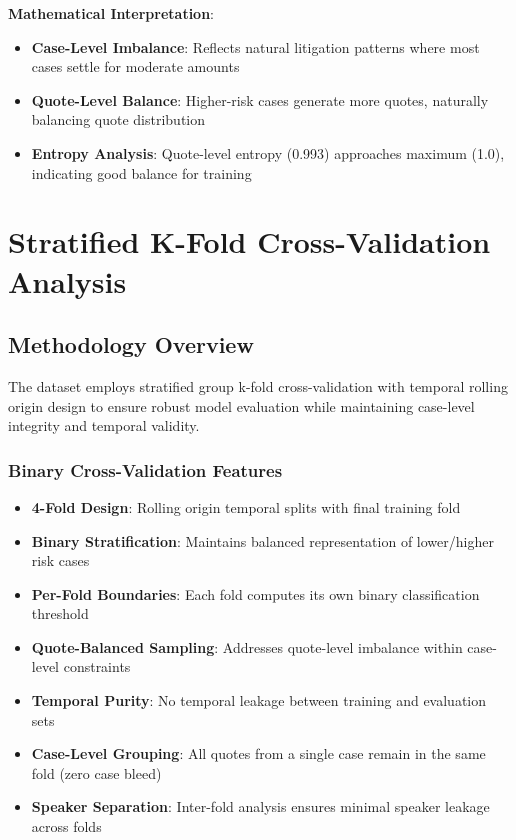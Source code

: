 \documentclass[11pt,a4paper]{article}
\begin{document}
\textbf{Mathematical Interpretation}:
\begin{itemize}
\item \textbf{Case-Level Imbalance}: Reflects natural litigation patterns where most cases settle for moderate amounts
\item \textbf{Quote-Level Balance}: Higher-risk cases generate more quotes, naturally balancing quote distribution
\item \textbf{Entropy Analysis}: Quote-level entropy (0.993) approaches maximum (1.0), indicating good balance for training
\end{itemize}



\section{Stratified K-Fold Cross-Validation Analysis}

\subsection{Methodology Overview}

The dataset employs stratified group k-fold cross-validation with temporal rolling origin design to ensure robust model evaluation while maintaining case-level integrity and temporal validity.

\subsubsection{Binary Cross-Validation Features}
\begin{itemize}
\item \textbf{4-Fold Design}: Rolling origin temporal splits with final training fold
\item \textbf{Binary Stratification}: Maintains balanced representation of lower/higher risk cases
\item \textbf{Per-Fold Boundaries}: Each fold computes its own binary classification threshold
\item \textbf{Quote-Balanced Sampling}: Addresses quote-level imbalance within case-level constraints
\item \textbf{Temporal Purity}: No temporal leakage between training and evaluation sets
\item \textbf{Case-Level Grouping}: All quotes from a single case remain in the same fold (zero case bleed)
\item \textbf{Speaker Separation}: Inter-fold analysis ensures minimal speaker leakage across folds
\end{itemize}
\end{document}
